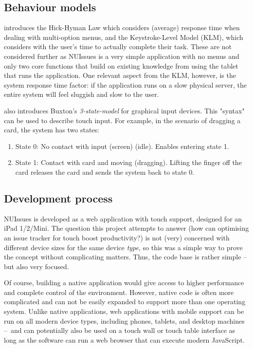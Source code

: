 \subsection{Behaviour models}

\textcite{mackenzie:motor-behaviour-models-for-human-computer-interaction:2003} introduces the Hick-Hyman Law which considers (average) response time when dealing with multi-option menus, and the Keystroke-Level Model (KLM), which considers with the user's time to actually complete their task. These are not considered further as NUIssues is a very simple application with no menus and only two core functions that build on existing knowledge from using the tablet that runs the application. One relevant aspect from the KLM, however, is the system response time factor: if the application runs on a slow physical server, the entire system will feel sluggish and slow to the user. 

\textcite[4]{mackenzie:motor-behaviour-models-for-human-computer-interaction:2003} also introduces Buxton's \textit{3-state-model} for graphical input devices. This "syntax" can be used to describe touch input. For example, in the scenario of dragging a card, the system has two states:

\begin{enumerate}
  \item State 0: No contact with input (screen) (idle). Enables entering state 1.
  \item State 1: Contact with card and moving (dragging). Lifting the finger off the card releases the card and sends the system back to state 0.
\end{enumerate}

\subsection{Development process}

NUIssues is developed as a web application with touch support, designed for an iPad 1/2/Mini. The question this project attempts to answer (how can optimising an issue tracker for touch boost productivity?) is not (very) concerned with different device sizes for the same device \textit{type}, so this was a simple way to prove the concept without complicating matters. Thus, the code base is rather simple -- but also very focused.

Of course, building a native application would give access to higher performance and complete control of the environment. However, native code is often more complicated and can not be easily expanded to support more than one operating system. Unlike native applications, web applications with mobile support can be run on all modern device types, including phones, tablets, and desktop machines – and can potentially also be used on a touch wall or touch table interface as long as the software can run a web browser that can execute modern JavaScript.

